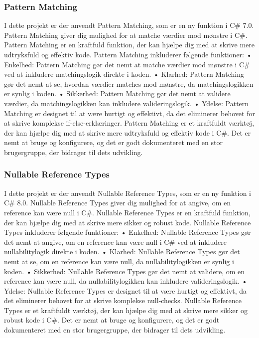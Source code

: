 \subsubsection{Pattern Matching}
I dette projekt er der anvendt Pattern Matching, som er en ny funktion i C\# 7.0. Pattern Matching giver dig mulighed for at matche værdier mod mønstre i C\#. Pattern Matching er en kraftfuld funktion, der kan hjælpe dig med at skrive mere udtryksfuld og effektiv kode.
Pattern Matching inkluderer følgende funktioner:
•	Enkelhed: Pattern Matching gør det nemt at matche værdier mod mønstre i C\# ved at inkludere matchingslogik direkte i koden.
•	Klarhed: Pattern Matching gør det nemt at se, hvordan værdier matches mod mønstre, da matchingslogikken er synlig i koden.
•	Sikkerhed: Pattern Matching gør det nemt at validere værdier, da matchingslogikken kan inkludere valideringslogik.
•	Ydelse: Pattern Matching er designet til at være hurtigt og effektivt, da det eliminerer behovet for at skrive komplekse if-else-erklæringer.
Pattern Matching er et kraftfuldt værktøj, der kan hjælpe dig med at skrive mere udtryksfuld og effektiv kode i C\#. Det er nemt at bruge og konfigurere, og det er godt dokumenteret med en stor brugergruppe, der bidrager til dets udvikling.

\subsubsection{Nullable Reference Types}
I dette projekt er der anvendt Nullable Reference Types, som er en ny funktion i C\# 8.0. Nullable Reference Types giver dig mulighed for at angive, om en reference kan være null i C\#. Nullable Reference Types er en kraftfuld funktion, der kan hjælpe dig med at skrive mere sikker og robust kode.
Nullable Reference Types inkluderer følgende funktioner:
•	Enkelhed: Nullable Reference Types gør det nemt at angive, om en reference kan være null i C\# ved at inkludere nullabilitylogik direkte i koden.
•	Klarhed: Nullable Reference Types gør det nemt at se, om en reference kan være null, da nullabilitylogikken er synlig i koden.
•	Sikkerhed: Nullable Reference Types gør det nemt at validere, om en reference kan være null, da nullabilitylogikken kan inkludere valideringslogik.
•	Ydelse: Nullable Reference Types er designet til at være hurtigt og effektivt, da det eliminerer behovet for at skrive komplekse null-checks.
Nullable Reference Types er et kraftfuldt værktøj, der kan hjælpe dig med at skrive mere sikker og robust kode i C\#. Det er nemt at bruge og konfigurere, og det er godt dokumenteret med en stor brugergruppe, der bidrager til dets udvikling.

